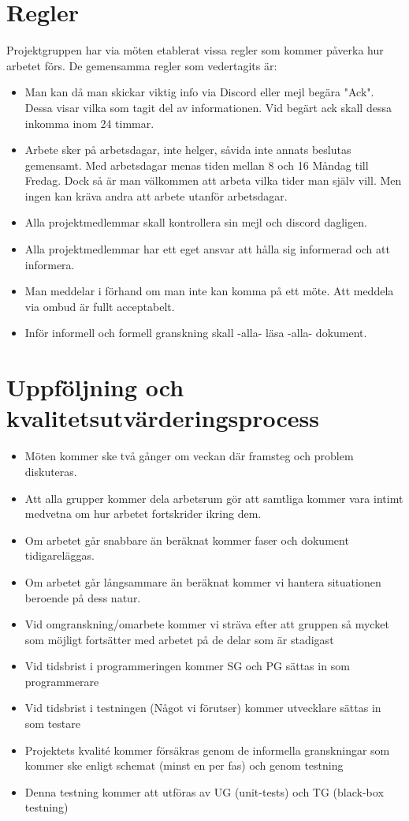 \documentclass[paper=a4, fontsize=11pt,twoside]{article}
\begin{document}
\section{Regler}
Projektgruppen har via möten etablerat vissa regler som kommer påverka hur arbetet förs.
De gemensamma regler som vedertagits är: {\color{red}{vedertagits: stavning?}}
\begin{itemize}
\item Man kan då man skickar viktig info via Discord eller mejl begära "Ack". Dessa visar vilka som tagit del av informationen. Vid begärt 		  ack skall dessa inkomma inom 24 timmar.	
\item Arbete sker på arbetsdagar, inte helger, såvida inte annats beslutas gemensamt. Med arbetsdagar menas tiden mellan 8 och 16 Måndag till Fredag. Dock så är man välkommen att arbeta vilka tider man själv vill. Men ingen kan kräva andra att arbete utanför arbetsdagar.
\item Alla projektmedlemmar skall kontrollera sin mejl och discord dagligen. 
\item Alla projektmedlemmar har ett eget ansvar att hålla sig informerad och att informera.
\item Man meddelar i förhand om man inte kan komma på ett möte. Att meddela via ombud är fullt acceptabelt.
\item Inför informell och formell granskning skall -alla- läsa -alla- dokument.
\end{itemize}

\section{Uppföljning och kvalitetsutvärderingsprocess}

\begin{itemize}
\item Möten kommer ske två gånger om veckan där framsteg och problem diskuteras.
\item Att alla grupper kommer dela arbetsrum gör att samtliga kommer vara intimt medvetna om hur arbetet fortskrider ikring dem.
\item Om arbetet går snabbare än beräknat kommer faser och dokument tidigareläggas.
\item Om arbetet går långsammare än beräknat kommer vi hantera situationen beroende på dess natur.
\item Vid omgranskning/omarbete kommer vi sträva efter att gruppen så mycket som möjligt fortsätter med arbetet på de delar som är stadigast
\item Vid tidsbrist i programmeringen kommer SG och PG sättas in som programmerare
\item Vid tidsbrist i testningen (Något vi förutser) kommer utvecklare sättas in som testare
\item Projektets kvalité kommer försäkras genom de informella granskningar som kommer ske enligt schemat (minst en per fas) och genom testning
\item Denna testning kommer att utföras av UG (unit-tests) och TG (black-box testning)
\end{itemize}
\end{document}
